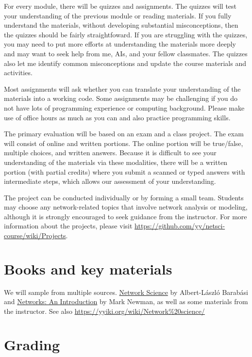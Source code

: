 \documentclass[11pt,article,oneside]{memoir} %
\begin{document}
For every module, there will be quizzes and assignments. The quizzes will test your understanding of the previous module or reading materials. If you fully understand the materials, without developing substantial misconceptions, then the quizzes should be fairly straightfoward. If you are struggling with the quizzes, you may need to put more efforts at understanding the materials more deeply and may want to seek help from me, AIs, and your fellow classmates. The quizzes also let me identify common misconceptions and update the course materials and activities. 

Most assignments will ask whether you can translate your understanding of the materials into a working code. Some assignments may be challenging if you do not have lots of programming experience or computing background. Please make use of office hours as much as you can and also practice programming skills. 

The primary evaluation will be based on an exam and a class project.
The exam will consist of online and written portions. The online portion will be true/false, multiple choices, and written answers. 
Because it is difficult to see your understanding of the materials via these modalities, there will be a written portion (with partial credits) where you submit a scanned or typed answers with intermediate steps, which allows our assessment of your understanding.  

The project can be conducted individually or by forming a small team.
Students may choose any network-related topics that involve network analysis or modeling, although it is strongly encouraged to seek guidance from the instructor.
For more information about the projects, please visit \url{https://github.com/yy/netsci-course/wiki/Projects}.

\section{Books and key materials} %

We will sample from multiple sources. 
\href{http://barabasi.com/networksciencebook/}{Network Science} by Albert-László
Barabási and
\href{https://www.amazon.com/Networks-Mark-Newman/dp/0198805098}{Networks:
An Introduction} by Mark Newman, as well as some materials from the instructor. See also \url{https://yyiki.org/wiki/Network%20science/} 

\section{Grading}\label{sec:grading_tentative} %
\end{document}
